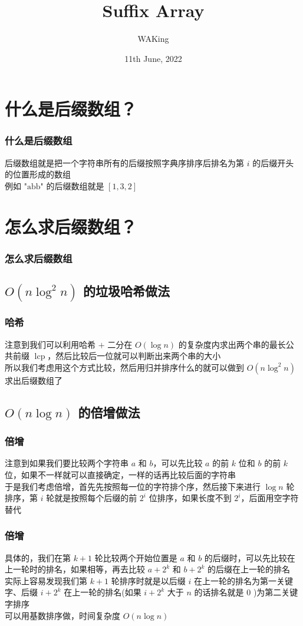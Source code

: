 \documentclass{beamer}
\title{Suffix Array}
\author{WAKing}
\institute{OIers'Chat}
\date{11th June, 2022}
\begin{document}
    \frame{\titlepage}
    \section{什么是后缀数组？}
    \begin{frame}
        \frametitle{什么是后缀数组}
        \pause
        后缀数组就是把一个字符串所有的后缀按照字典序排序后排名为第 $i$ 的后缀开头的位置形成的数组\\
        \pause
        例如 $\text{"abb"}$ 的后缀数组就是 $\left[1,3,2\right]$
    \end{frame}
    \section{怎么求后缀数组？}
    \begin{frame}
        \frametitle{怎么求后缀数组}
    \end{frame}
    \subsection{$O(n\log^2n)$ 的垃圾哈希做法}
    \begin{frame}
        \frametitle{哈希}
        \pause
        注意到我们可以利用哈希 $+$ 二分在 $O(\log n)$ 的复杂度内求出两个串的最长公共前缀 $\operatorname{lcp}$，然后比较后一位就可以判断出来两个串的大小\\
        \pause
        所以我们考虑用这个方式比较，然后用归并排序什么的就可以做到 $O(n\log^2n)$ 求出后缀数组了
    \end{frame}
    \subsection{$O(n\log n)$ 的倍增做法}
    \begin{frame}
        \frametitle{倍增}
        \pause
        注意到如果我们要比较两个字符串 $a$ 和 $b$，可以先比较 $a$ 的前 $k$ 位和 $b$ 的前 $k$ 位，如果不一样就可以直接确定，一样的话再比较后面的字符串\\
        \pause
        于是我们考虑倍增，首先先按照每一位的字符排个序，然后接下来进行 $\log n$ 轮排序，第 $i$ 轮就是按照每个后缀的前 $2^i$ 位排序，如果长度不到 $2^i$，后面用空字符替代\\
    \end{frame}
    \begin{frame}
        \frametitle{倍增}
        \pause
        具体的，我们在第 $k+1$ 轮比较两个开始位置是 $a$ 和 $b$ 的后缀时，可以先比较在上一轮时的排名，如果相等，再去比较 $a+2^k$ 和 $b+2^k$ 的后缀在上一轮的排名\\
        \pause
        实际上容易发现我们第 $k+1$ 轮排序时就是以后缀 $i$ 在上一轮的排名为第一关键字、后缀 $i+2^k$ 在上一轮的排名(如果 $i+2^k$ 大于 $n$ 的话排名就是 $0$ )为第二关键字排序\\
        \pause
        可以用基数排序做，时间复杂度 $O(n\log n)$
    \end{frame}
\end{document}
